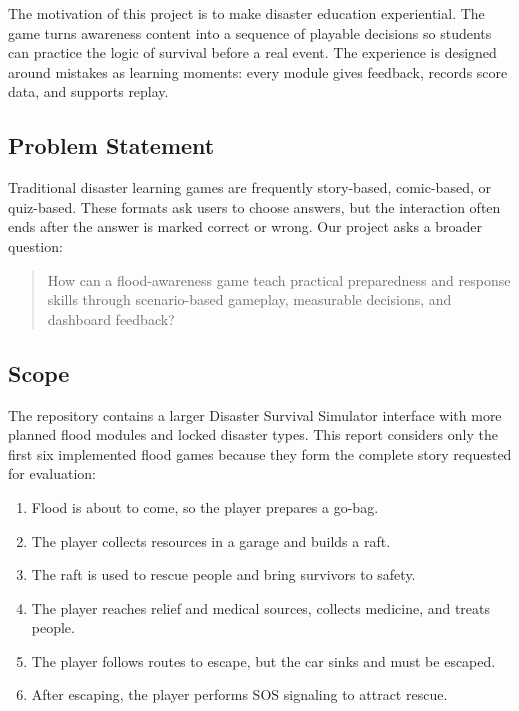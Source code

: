 \documentclass[11pt,a4paper]{article}
\begin{document}
The motivation of this project is to make disaster education experiential. The game turns awareness content into a sequence of playable decisions so students can practice the logic of survival before a real event. The experience is designed around mistakes as learning moments: every module gives feedback, records score data, and supports replay.

\subsection{Problem Statement}
Traditional disaster learning games are frequently story-based, comic-based, or quiz-based. These formats ask users to choose answers, but the interaction often ends after the answer is marked correct or wrong. Our project asks a broader question:

\begin{quote}\small
How can a flood-awareness game teach practical preparedness and response skills through scenario-based gameplay, measurable decisions, and dashboard feedback?
\end{quote}

\subsection{Scope}
The repository contains a larger Disaster Survival Simulator interface with more planned flood modules and locked disaster types. This report considers only the first six implemented flood games because they form the complete story requested for evaluation:
\begin{enumerate}
  \item Flood is about to come, so the player prepares a go-bag.
  \item The player collects resources in a garage and builds a raft.
  \item The raft is used to rescue people and bring survivors to safety.
  \item The player reaches relief and medical sources, collects medicine, and treats people.
  \item The player follows routes to escape, but the car sinks and must be escaped.
  \item After escaping, the player performs SOS signaling to attract rescue.
\end{enumerate}
\end{document}
